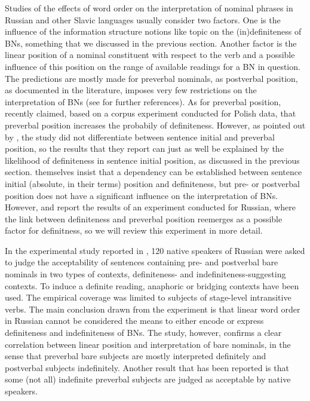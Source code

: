\documentclass[output=paper,colorlinks,citecolor=brown]{langscibook}
\begin{document}
Studies of the effects of word order on the interpretation of nominal phrases in Russian and other Slavic languages usually consider two factors. One is the influence of the information structure notions like topic on the (in)definiteness of BNs, something that we discussed in the previous section. Another factor is the linear position of a nominal constituent with respect to the verb and a possible influence of this position on the range of available readings for a BN in question. The predictions are mostly made for preverbal nominals, as postverbal position, as documented in the literature, imposes very few restrictions on the interpretation of BNs (see \citealt{brun01, simik-burianova20} for further references). As for preverbal position, \citet{czardybonetal14} recently claimed, based on a corpus experiment conducted for Polish data, that preverbal position increases the probabily of definiteness. However, as pointed out by \citet{simik-burianova20}, the study did not differentiate between sentence initial and preverbal position, so the results that they report can just as well be explained by the likelihood of definiteness in sentence initial position, as discussed in the previous section.  \citet{simik-burianova20} themselves insist that a dependency can be established between sentence initial (absolute, in their terms) position and definiteness, but pre- or postverbal position does not have a significant influence on the interpretation of BNs. However, \citet{seresetal} and \citet{Borik.etal2020} report the results of an experiment conducted for Russian, where the link between definiteness and preverbal position reemerges as a possible factor for definitness, so we will review this experiment in more detail. 

In the experimental study reported in \citet{Borik.etal2020, seresetal}, 120 native speakers of Russian were asked to judge the acceptability of sentences containing pre- and postverbal bare nominals in two types of contexts, definiteness- and indefiniteness-suggesting contexts. To induce a definite reading, anaphoric or bridging contexts have been used. The empirical coverage was limited to subjects of stage-level intransitive verbs. The main conclusion drawn from the experiment is that linear word order in Russian cannot be considered the means to either encode or express definiteness and indefiniteness of BNs. The study, however, confirms a clear correlation between linear position and interpretation of bare nominals, in the sense that preverbal bare subjects are mostly interpreted definitely and postverbal subjects indefinitely. Another result that has been reported is that some (not all) indefinite preverbal subjects are judged as acceptable by native speakers. 
\end{document}
